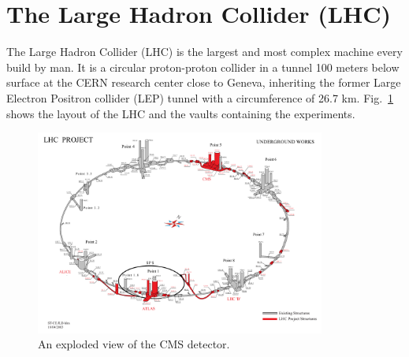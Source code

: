 \section{The Large Hadron Collider (LHC)}
\label{sec:LHC}
The Large Hadron Collider (LHC)\cite{1748-0221-3-08-S08001}\cite{Bruning:782076}\cite{ipac11:lamont} is the largest and most complex machine every build by man. It is a circular proton-proton collider in a tunnel 100 meters below surface at the CERN research center close to Geneva, inheriting the former Large Electron Positron collider (LEP) tunnel with a circumference of 26.7 km. Fig.~\ref{fig:LHC} shows the layout of the LHC and the vaults containing the experiments. \\
\begin{figure}[tbhn]
\begin{center}
\includegraphics[width=0.85\textwidth]{detector/figures/LHCUnder.pdf}
\end{center}
\caption{An exploded view of the CMS detector.}
\label{fig:LHC}
\end{figure}




